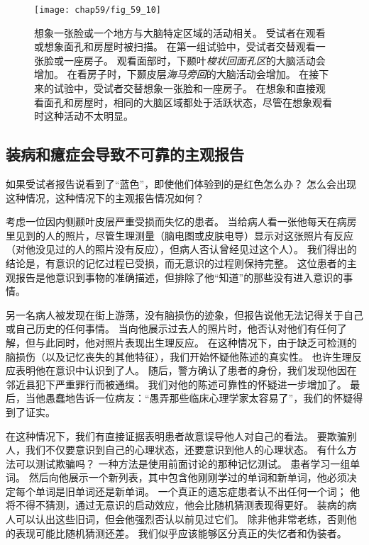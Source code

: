 \begin{figure}[htbp]
	\centering
	\texttt{[image: chap59/fig\_59\_10]}
	\caption{想象一张脸或一个地方与大脑特定区域的活动相关。
		受试者在观看或想象面孔和房屋时被扫描。
		在第一组试验中，受试者交替观看一张脸或一座房子。
		观看面部时，下颞叶\textit{梭状回面孔区}的大脑活动会增加。
		在看房子时，下颞皮层\textit{海马旁回}的大脑活动会增加。
		在接下来的试验中，受试者交替想象一张脸和一座房子。
		在想象和直接观看面孔和房屋时，相同的大脑区域都处于活跃状态，尽管在想象观看时这种活动不太明显\cite{o2000mental}。}
	\label{fig:59_10}
\end{figure}



\subsection{装病和癔症会导致不可靠的主观报告}

如果受试者报告说看到了“蓝色”，即使他们体验到的是红色怎么办？
怎么会出现这种情况，这种情况下的主观报告情况如何？


考虑一位因内侧颞叶皮层严重受损而失忆的患者。
当给病人看一张他每天在病房里见到的人的照片，尽管生理测量（脑电图或皮肤电导）显示对这张照片有反应（对他没见过的人的照片没有反应），但病人否认曾经见过这个人）。
我们得出的结论是，有意识的记忆过程已受损，而无意识的过程则保持完整。
这位患者的主观报告是他意识到事物的准确描述，但排除了他“知道”的那些没有进入意识的事情。


另一名病人被发现在街上游荡，没有脑损伤的迹象，但报告说他无法记得关于自己或自己历史的任何事情。
当向他展示过去人的照片时，他否认对他们有任何了解，但与此同时，他对照片表现出生理反应。
在这种情况下，由于缺乏可检测的脑损伤（以及记忆丧失的其他特征），我们开始怀疑他陈述的真实性。
也许生理反应表明他在意识中认识到了人。
随后，警方确认了患者的身份，我们发现他因在邻近县犯下严重罪行而被通缉。
我们对他的陈述可靠性的怀疑进一步增加了。
最后，当他愚蠢地告诉一位病友：“愚弄那些临床心理学家太容易了”，我们的怀疑得到了证实。


在这种情况下，我们有直接证据表明患者故意误导他人对自己的看法。
要欺骗别人，我们不仅要意识到自己的心理状态，还要意识到他人的心理状态。
有什么方法可以测试欺骗吗？
一种方法是使用前面讨论的那种记忆测试。
患者学习一组单词。
然后向他展示一个新列表，其中包含他刚刚学过的单词和新单词，他必须决定每个单词是旧单词还是新单词。
一个真正的遗忘症患者认不出任何一个词；
他将不得不猜测，通过无意识的启动效应，他会比随机猜测表现得更好。
装病的病人可以认出这些旧词，但会他强烈否认以前见过它们。
除非他非常老练，否则他的表现可能比随机猜测还差。
我们似乎应该能够区分真正的失忆者和伪装者。


